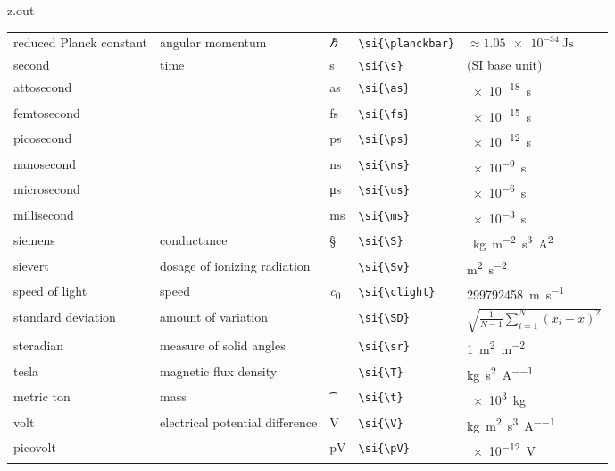 \begin{VerbatimOut}{z.out}
{\begin{longtable}{@{}P{1.4in}P{1in}llP{1.8in}@{}}
    \vsp
    reduced Planck constant&
      angular momentum&
      \si{\planckbar}&
      \verb+\si{\planckbar}+&
      \(\approx \SI{1.05e-34}{\J\s}\)\\
    \vsp
    second&
      time&
      \si{\s}&
      \verb+\si{\s}+&
      (SI base unit)\\
    \quad attosecond&
      \ditto&
      \si{\as}&
      \verb+\si{\as}+&
      \SI{e-18}{\s}\\
    \quad femtosecond&
      \ditto&
      \si{\fs}&
      \verb+\si{\fs}+&
      \SI{e-15}{\s}\\
    \quad picosecond&
      \ditto&
      \si{\ps}&
      \verb+\si{\ps}+&
      \SI{e-12}{\s}\\
    \quad nanosecond&
      \ditto&
      \si{\ns}&
      \verb+\si{\ns}+&
      \SI{e-9}{\s}\\
    \quad microsecond&
      \ditto&
      \si{\us}&
      \verb+\si{\us}+&
      \SI{e-6}{\s}\\
    \quad millisecond&
      \ditto&
      \si{\ms}&
      \verb+\si{\ms}+&
      \SI{e-3}{\s}\\
    \vsp
    siemens&
      conductance&
      \si{\S}&
      \verb+\si{\S}+&
      \si{\per\kg\per\m\squared\s\cubed\A\squared}\\
    \vsp
    sievert&
      dosage of ionizing radiation&
      \si{\Sv}&
      \verb+\si{\Sv}+&
      \si{\m\squared\per\s\squared}\\
    \vsp
    speed of light&
      speed&
      \si{\clight}&
      \verb+\si{\clight}+&
      \SI{299792458}{\m\per\s}\\
    \vsp
    standard deviation&
      amount of variation&
      \si{\SD}&
      \verb+\si{\SD}+&
      $\displaystyle \sqrt{\frac 1{N-1} \sum_{i=1}^N(x_i-\bar x)^2}$\\
    \vsp
    steradian&
      measure of solid angles&
      \si{\sr}&
      \verb+\si{\sr}+&
      \SI{1}{\m\squared\per\m\squared}\\
    \vsp
    tesla&
      magnetic flux density&
      \si{\T}&
      \verb+\si{\T}+&
      \si{\kg\per\s\squared\per\A}\\
    \vsp
    metric ton&
      mass&
      \si{\t}&
      \verb+\si{\t}+&
      \SI{e3}{\kg}\\
    \vsp
    volt&
      electrical potential difference&
      \si{\V}&
      \verb+\si{\V}+&
      \si{\kg\m\squared\per\s\cubed\per\A}\\
    \quad picovolt&
      \ditto&
      \si{\pV}&
      \verb+\si{\pV}+&
      \SI{e-12}{\V}\\

\end{longtable}}
\end{VerbatimOut}
